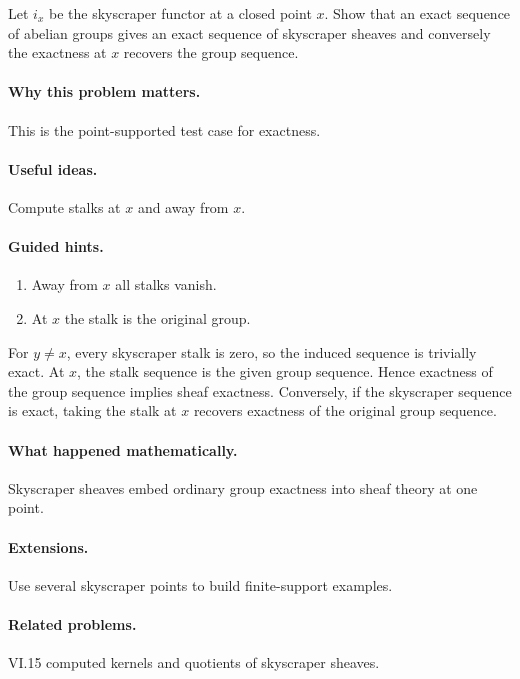 \begin{problem}\label{prob:vi16-p15}
Let $i_x$ be the skyscraper functor at a closed point $x$.  Show that an exact sequence of abelian groups gives an exact sequence of skyscraper sheaves and conversely the exactness at $x$ recovers the group sequence.
\end{problem}

\ifdefined\FullProblemDossiers
\paragraph{Why this problem matters.}
This is the point-supported test case for exactness.

\paragraph{Useful ideas.}
Compute stalks at $x$ and away from $x$.

\paragraph{Guided hints.}
\begin{enumerate}
\item Away from $x$ all stalks vanish.
\item At $x$ the stalk is the original group.
\end{enumerate}

\begin{solution}
For $y\neq x$, every skyscraper stalk is zero, so the induced sequence is trivially exact.  At $x$, the stalk sequence is the given group sequence.  Hence exactness of the group sequence implies sheaf exactness.  Conversely, if the skyscraper sequence is exact, taking the stalk at $x$ recovers exactness of the original group sequence.
\end{solution}

\paragraph{What happened mathematically.}
Skyscraper sheaves embed ordinary group exactness into sheaf theory at one point.

\paragraph{Extensions.}
Use several skyscraper points to build finite-support examples.

\paragraph{Related problems.}
VI.15 computed kernels and quotients of skyscraper sheaves.
\fi
